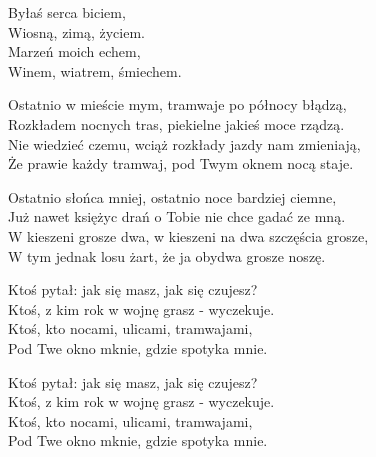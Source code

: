 \begin{text}
    \vin Byłaś serca biciem,\\
    \vin Wiosną, zimą, życiem.\\
    \vin Marzeń moich echem,\\
    \vin Winem, wiatrem, śmiechem.

    Ostatnio w mieście mym, tramwaje po północy błądzą,\\
    Rozkładem nocnych tras, piekielne jakieś moce rządzą.\\
    Nie wiedzieć czemu, wciąż rozkłady jazdy nam zmieniają,\\
    Że prawie każdy tramwaj, pod Twym oknem nocą staje.

    Ostatnio słońca mniej, ostatnio noce bardziej ciemne,\\
    Już nawet księżyc drań o Tobie nie chce gadać ze mną.\\
    W kieszeni grosze dwa, w kieszeni na dwa szczęścia grosze,\\
    W tym jednak losu żart, że ja obydwa grosze noszę.

    Ktoś pytał: jak się masz, jak się czujesz?\\
    Ktoś, z kim rok w wojnę grasz - wyczekuje.\\
    Ktoś, kto nocami, ulicami, tramwajami,\\
    Pod Twe okno mknie, gdzie spotyka mnie.

    Ktoś pytał: jak się masz, jak się czujesz?\\
    Ktoś, z kim rok w wojnę grasz - wyczekuje.\\
    Ktoś, kto nocami, ulicami, tramwajami,\\
    Pod Twe okno mknie, gdzie spotyka mnie.
\end{text}
